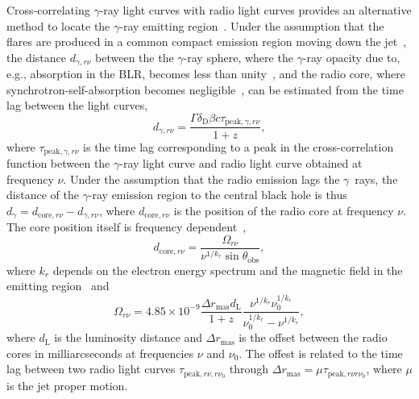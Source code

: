 \documentclass[twocolumn,linenumbers]{aastex62}
\newcommand{\Grays}{$\gamma$~rays\xspace}
\newcommand{\gray}{$\gamma$-ray\xspace}
\begin{document}
Cross-correlating \gray light curves with radio light curves provides an alternative method to locate the \gray emitting region~\citep[e.g.,][]{2014MNRAS.441.1899F}.
Under the assumption that the flares are produced in a common compact emission  region moving down the jet~\citep[e.g.,][]{2014MNRAS.445..428M},
the distance $d_{\gamma,r\nu}$ between the 
the \gray sphere, where the \gray opacity due to, e.g., absorption in the BLR, becomes less than unity~\citep{1995ApJ...441...79B}, and the 
radio core, where synchrotron-self-absorption becomes negligible~\citep[][]{1981ApJ...243..700K}, 
can be estimated from the time lag between the light curves, 
\begin{equation}
    d_{\gamma,r\nu} = \frac{\Gamma\delta_\mathrm{D}\beta c\tau_{\mathrm{peak},\gamma,r\nu}}{1 + z},
    \label{eq:dgamma-r}
\end{equation}
where $\tau_{\mathrm{peak},\gamma,r\nu}$ is the time lag corresponding to a peak in the cross-correlation function between the \gray light curve and radio light curve obtained at frequency $\nu$.
Under the assumption that the radio emission lags the \Grays, the distance of the \gray emission region to the central black hole is thus $d_\gamma = d_{\mathrm{core},r\nu} - d_{\gamma,r\nu}$, where $d_{\mathrm{core},r\nu}$ is the position of the radio core at frequency $\nu$.
The core position itself is frequency dependent~\citep[the core shift effect, see, e.g.,][]{1998A&A...330...79L},
\begin{equation}
    d_{\mathrm{core},r\nu} = \frac{\Omega_{r\nu}}{\nu^{1/k_r}\sin\theta_\mathrm{obs}},
     \label{eq:core-shift1}
\end{equation}
where $k_r$ depends on the electron energy spectrum and the magnetic field in the emitting region~\citep{1981ApJ...243..700K} and
\begin{equation}
    \Omega_{r\nu} = 4.85\times10^{-9} \frac{\Delta r_\mathrm{mas} d_\mathrm{L}}{1 + z}\frac{\nu^{1/k_r}\nu_0^{1/k_r}}{\nu_0^{1/k_r}-\nu^{1/k_r}},
    \label{eq:core-shift2}
\end{equation}
where $d_\mathrm{L}$ is the luminosity distance and $\Delta r_\mathrm{mas}$ is the offset between the radio cores in milliarcseconds at frequencies $\nu$ and $\nu_0$. 
The offest is related to the time lag between two radio light curves $\tau_{\mathrm{peak},r\nu,r\nu_0}$ through 
$\Delta r_\mathrm{mas} = \mu \tau_{\mathrm{peak},r\nu r\nu_0}$, where $\mu$ is the jet proper motion. 
\end{document}
